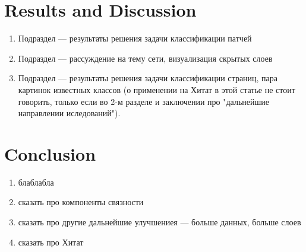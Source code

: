 \documentclass[conference,a4paper,twocolumn]{IEEEtran}
\begin{document}
\section{Results and Discussion}
\begin{enumerate}
	\item Подраздел --- результаты решения задачи классификации патчей
	\item Подраздел --- рассуждение на тему сети, визуализация скрытых слоев 
	\item Подраздел --- результаты решения задачи классификации страниц, пара картинок известных классов (о применении на Хитат в этой статье не стоит говорить, только если во 2-м разделе и заключении про "дальнейшие направлении иследований").
\end{enumerate}




\section{Conclusion}
\begin{enumerate}
	\item блаблабла
 	\item сказать про компоненты связности
 	\item сказать про другие дальнейшие улучшениея --- больше данных, больше слоев
 	\item сказать про Хитат
\end{enumerate}



%
%
%
\end{document}
